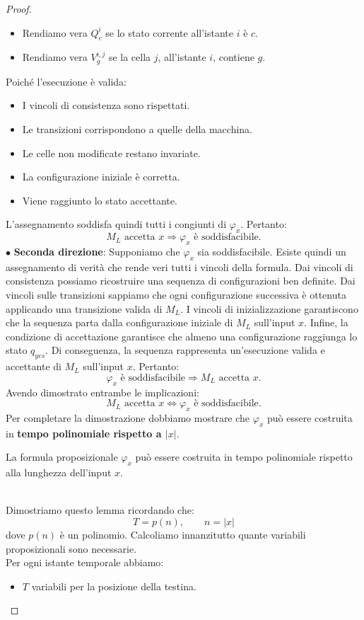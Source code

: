 \begin{proof}
\begin{itemize}[label = --]
    \item Rendiamo vera $Q_c^i$ se lo stato
    corrente all'istante $i$ è $c$.

    \item Rendiamo vera $V_g^{i,j}$ se
    la cella $j$, all'istante $i$, contiene $g$.
\end{itemize}
Poiché l'esecuzione è valida:
\begin{itemize}[label = --]
    \item I vincoli di consistenza sono rispettati.
    \item Le transizioni corrispondono a quelle
    della macchina.
    \item Le celle non modificate restano invariate.
    \item La configurazione iniziale è corretta.
    \item Viene raggiunto lo stato accettante.
\end{itemize}
L'assegnamento soddisfa quindi tutti
i congiunti di $\varphi_x$.
Pertanto:
\[
M_L\text{ accetta }x
\Rightarrow
\varphi_x\text{ è soddisfacibile}.
\]
$\bullet$ \textbf{Seconda direzione}:
Supponiamo che $\varphi_x$ sia soddisfacibile.
Esiste quindi un assegnamento di verità
che rende veri tutti i vincoli della formula.
Dai vincoli di consistenza possiamo ricostruire
una sequenza di configurazioni ben definite.
Dai vincoli sulle transizioni sappiamo
che ogni configurazione successiva è ottenuta
applicando una transizione valida di $M_L$.
I vincoli di inizializzazione garantiscono
che la sequenza parta dalla configurazione
iniziale di $M_L$ sull'input $x$.
Infine, la condizione di accettazione garantisce
che almeno una configurazione raggiunga
lo stato $q_{yes}$.
Di conseguenza, la sequenza rappresenta
un'esecuzione valida e accettante di $M_L$
sull'input $x$.
Pertanto:
\[
\varphi_x\text{ è soddisfacibile}
\Rightarrow
M_L\text{ accetta }x.
\]
Avendo dimostrato entrambe le implicazioni:
\[
\boxed{
M_L\text{ accetta }x
\iff
\varphi_x\text{ è soddisfacibile}.
}
\]
Per completare la dimostrazione dobbiamo
mostrare che $\varphi_x$ può essere costruita
in \textbf{tempo polinomiale rispetto a $|x|$}.\smallskip\\
\colorbox{SALZO}{\parbox{\dimexpr\linewidth-2\fboxsep}{
\begin{theorem}
La formula proposizionale $\varphi_x$
può essere costruita in tempo polinomiale
rispetto alla lunghezza dell'input $x$.
\end{theorem}
}}\smallskip\\
Dimostriamo questo lemma ricordando che:
\[
T=p(n),\qquad n=|x|
\]
dove $p(n)$ è un polinomio.
Calcoliamo innanzitutto quante variabili
proposizionali sono necessarie.\\
Per ogni istante temporale abbiamo:
\begin{itemize}
    \item $T$ variabili per la posizione
    della testina.


\end{itemize}
\end{proof}
